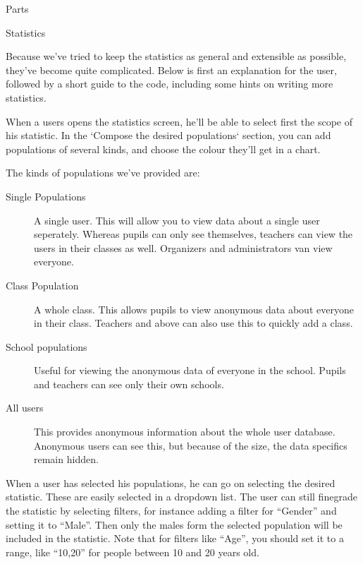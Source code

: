 \documentclass[]{article}
\begin{document}
\begin{section}{Parts}
    \begin{subsection}{Statistics}

        Because we've tried to keep the statistics as general and extensible as
        possible, they've become quite complicated. Below is first an
        explanation for the user, followed by a short guide to the code,
        including some hints on writing more statistics.

        When a users opens the statistics screen, he'll be able to select first
        the scope of his statistic. In the `Compose the desired populations`
        section, you can add populations of several kinds, and choose the colour
        they'll get in a chart.

        The kinds of populations we've provided are:
        \begin{description}
            \item[Single Populations] A single user. This will allow you to view
                data about a single user seperately. Whereas pupils can only see
                themselves, teachers can view the users in their classes as
                well. Organizers and administrators van view everyone.
            \item[Class Population] A whole class. This allows pupils to view
                anonymous data about everyone in their class. Teachers and above
                can also use this to quickly add a class.
            \item[School populations] Useful for viewing the anonymous data of
                everyone in the school. Pupils and teachers can see only their
                own schools.
            \item[All users] This provides anonymous information about the whole
                user database. Anonymous users can see this, but because of the
                size, the data specifics remain hidden.
        \end{description}

        When a user has selected his populations, he can go on selecting the
        desired statistic. These are easily selected in a dropdown list. The
        user can still finegrade the statistic by selecting filters, for
        instance adding a filter for ``Gender'' and setting it to ``Male''. Then
        only the males form the selected population will be included in the
        statistic. Note that for filters like ``Age'', you should set it to a
        range, like ``10,20'' for people between 10 and 20 years old.


\end{subsection}
\end{section}
\end{document}

